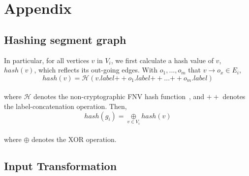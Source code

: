 \section{Appendix}


%


\subsection{Hashing segment graph}
\label{s:appendix:hash}
In particular, for all vertices $v$ in $V_i$, we first calculate a
hash value of $v$, $hash(v)$, which reflects its out-going edges. With
$o_1, ..., o_m$ that $v \rightarrow o_x \in E_i$,
%
%
\\[1pt]
\[
  hash(v) = \mathcal{H}(v.label {++} o_1.label {++} ... {++}
  o_m.label)
\]
\\[1pt]
%
where $\mathcal{H}$ denotes the
non-cryptographic FNV hash function~\cite{fnv, fnv-go}, and ${++}$
denotes the label-concatenation operation.
%
Then,
%
\\[1pt]
\[
  hash(g_i) = \underset{v \in V_i}{\oplus} hash(v)
\]
\\[1pt]
%
where $\oplus$ denotes the XOR operation.



\subsection{Input Transformation}
\label{s:appendix:inputtransform}




